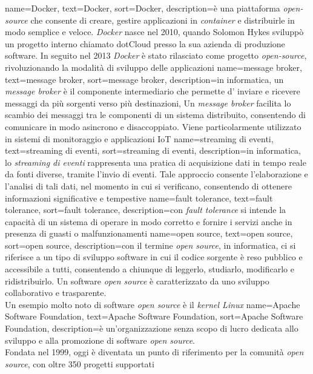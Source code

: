 {
    name={Docker},
    text=Docker,
    sort=Docker,
    description={è una piattaforma \textit{open-source} che consente di creare, gestire applicazioni in \textit{container} e distribuirle in modo semplice e veloce.
    \textit{Docker} nasce nel 2010, quando Solomon Hykes sviluppò un progetto interno chiamato dotCloud presso la sua azienda di produzione software. In seguito 
    nel 2013 \textit{Docker} è stato rilasciato come progetto \textit{open-source}, rivoluzionando la modalità di sviluppo delle applicazioni}
}
{
    name={message broker},
    text=message broker,
    sort=message broker,
    description={in informatica, un \textit{message broker} è  il componente intermediario che permette d' inviare e ricevere messaggi da più sorgenti verso più destinazioni,
    Un \textit{message broker} facilita lo scambio dei messaggi 
    tra le componenti di un sistema distribuito, consentendo di comunicare in modo asincrono e disaccoppiato.
    Viene particolarmente utilizzato in sistemi di monitoraggio e applicazioni IoT}
}
{
    name={streaming di eventi},
    text=streaming di eventi,
    sort=streaming di eventi,
    description={in informatica, lo \textit{streaming di eventi} rappresenta una pratica di acquisizione dati in tempo reale da fonti diverse, 
    tramite l'invio di eventi. Tale approccio consente l'elaborazione e l'analisi di tali dati, nel momento in cui si verificano,
    consentendo di ottenere informazioni significative e tempestive}
}
{
    name={fault tolerance},
    text=fault tolerance,
    sort=fault tolerance,
    description={con \textit{fault tolerance} si intende la capacità di un sistema di operare in modo corretto e fornire 
    i servizi anche in presenza di guasti o malfunzionamenti}
}
{
    name={open source},
    text=open source,
    sort=open source,
    description={con il termine \textit{open source}, in informatica, ci si riferisce a un tipo di sviluppo software in cui il codice sorgente è reso pubblico e accessibile a tutti,
    consentendo a chiunque di leggerlo, studiarlo, modificarlo e ridistribuirlo.
    Un software \textit{open source} è caratterizzato da uno sviluppo collaborativo e trasparente.\\
    Un esempio molto noto di software \textit{open source} è il \textit{kernel Linux}}
}
{
    name={Apache Software Foundation},
    text=Apache Software Foundation,
    sort=Apache Software Foundation,
    description={è un'organizzazione senza scopo di lucro dedicata allo sviluppo e alla promozione di software \textit{open source}.\\
    Fondata nel 1999, oggi è diventata un punto di riferimento per la comunità \textit{open source}, con oltre 350 progetti supportati}
}

